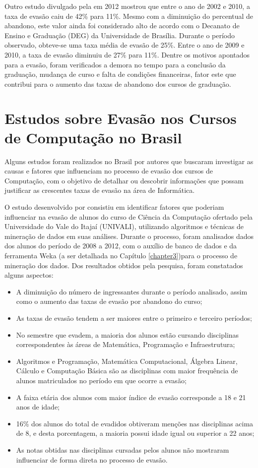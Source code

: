 Outro estudo divulgado pela \citet{unb2} em 2012 mostrou que entre o ano de 2002 e 2010, a taxa de evasão caiu de 42\% para 11\%. Mesmo com a diminuição do percentual de abandono, este valor ainda foi considerado alto de acordo com o Decanato de Ensino e Graduação (DEG) da Universidade de Brasília. Durante o período observado, obteve-se uma taxa média de evasão de 25\%. Entre o ano de 2009 e 2010, a taxa de evasão diminuiu de 27\% para 11\%. Dentre os motivos apontados para a evasão, foram verificados a demora no tempo para a conclusão da graduação, mudança de curso e falta de condições financeiras, fator este que contribui para o aumento das taxas de abandono dos cursos de graduação.

\section{Estudos sobre Evasão nos Cursos de Computação no Brasil} \label{2title4}

Alguns estudos foram realizados no Brasil por autores que buscaram investigar as causas e fatores que influenciam no processo de evasão dos cursos de Computação, com o objetivo de detalhar ou descobrir informações que possam justificar as crescentes taxas de evasão na área de Informática. 

O estudo desenvolvido por \citet{carniel2013} consistiu em identificar fatores que poderiam influenciar na evasão de alunos do curso de Ciência da Computação ofertado pela Universidade do Vale do Itajaí (UNIVALI), utilizando algoritmos e técnicas de mineração de dados em suas análises. Durante o processo, foram analisados dados dos alunos do período de 2008 a 2012, com o auxílio de banco de dados e da ferramenta Weka \citep{weka} (a ser detalhada no Capítulo \ref{chapter3})para o processo de mineração dos dados. Dos resultados obtidos pela pesquisa, foram constatados alguns aspectos:

\begin{itemize}
\item A diminuição do número de ingressantes durante o período analisado, assim como o aumento das taxas de evasão por abandono do curso;
\item As taxas de evasão tendem a ser maiores entre o  primeiro e terceiro períodos;
\item No semestre que evadem, a maioria dos alunos estão cursando disciplinas correspondentes às áreas de Matemática, Programação e Infraestrutura;
\item Algoritmos e Programação, Matemática Computacional, Álgebra Linear, Cálculo e Computação Básica são as disciplinas com maior frequência de alunos matriculados no período em que ocorre a evasão;
\item A faixa etária dos alunos com maior índice de evasão corresponde a 18 e 21 anos de idade;
\item 16\% dos alunos do total de evadidos obtiveram menções nas disciplinas acima de 8, e desta porcentagem, a maioria possui idade igual ou superior a 22 anos;
\item As notas obtidas nas disciplinas cursadas pelos alunos não mostraram influenciar de forma direta no processo de evasão.
\end{itemize}


